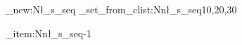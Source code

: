 \ExplSyntaxOn
\seq_new:N\l_s_seq
\seq_set_from_clist:Nn\l_s_seq{10,20,30}

\seq_item:Nn\l_s_seq{-1}
\ExplSyntaxOff
